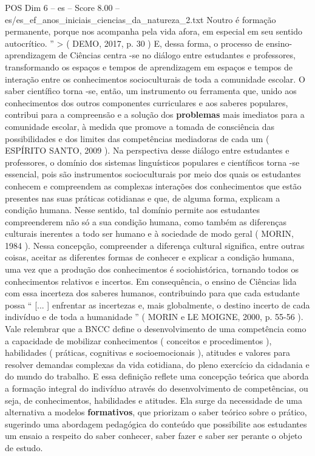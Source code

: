 \begin{textsample}{POS Dim 6 – es – Score 8.00 – es/es\_ef\_anos\_iniciais\_ciencias\_da\_natureza\_2.txt}
Noutro é formação permanente, porque nos acompanha pela vida afora, em especial em seu sentido autocrítico. ” > ( DEMO, 2017, p. 30 ) E, dessa forma, o processo de ensino-aprendizagem de Ciências centra -se no diálogo entre estudantes e professores, transformando os espaços e tempos de aprendizagem em espaços e tempos de interação entre os conhecimentos socioculturais de toda a comunidade escolar.
O saber científico torna -se, então, um instrumento ou ferramenta que, unido aos conhecimentos dos outros componentes curriculares e aos saberes populares, contribui para a compreensão e a solução dos \textbf{problemas} mais imediatos para a comunidade escolar, à medida que promove a tomada de consciência das possibilidades e dos limites das competências mediadoras de cada um ( ESPÍRITO SANTO, 2009 ).
Na perspectiva desse diálogo entre estudantes e professores, o domínio dos sistemas linguísticos populares e científicos torna -se essencial, pois são instrumentos socioculturais por meio dos quais os estudantes conhecem e compreendem as complexas interações dos conhecimentos que estão presentes nas suas práticas cotidianas e que, de alguma forma, explicam a condição humana.
Nesse sentido, tal domínio permite aos estudantes compreenderem não só a sua condição humana, como também as diferenças culturais inerentes a todo ser humano e à sociedade de modo geral ( MORIN, 1984 ).
Nessa concepção, compreender a diferença cultural significa, entre outras coisas, aceitar as diferentes formas de conhecer e explicar a condição humana, uma vez que a produção dos conhecimentos é sociohistórica, tornando todos os conhecimentos relativos e incertos.
Em consequência, o ensino de Ciências lida com essa incerteza dos saberes humanos, contribuindo para que cada estudante possa “ [... ] enfrentar as incertezas e, mais globalmente, o destino incerto de cada indivíduo e de toda a humanidade ” ( MORIN e LE MOIGNE, 2000, p. 55-56 ).
Vale relembrar que a BNCC define o desenvolvimento de uma competência como a capacidade de mobilizar conhecimentos ( conceitos e procedimentos ), habilidades ( práticas, cognitivas e socioemocionais ), atitudes e valores para resolver demandas complexas da vida cotidiana, do pleno exercício da cidadania e do mundo do trabalho.
E essa definição reflete uma concepção teórica que aborda a formação integral do indivíduo através do desenvolvimento de competências, ou seja, de conhecimentos, habilidades e atitudes.
Ela surge da necessidade de uma alternativa a modelos \textbf{formativos}, que priorizam o saber teórico sobre o prático, sugerindo uma abordagem pedagógica do conteúdo que possibilite aos estudantes um ensaio a respeito do saber conhecer, saber fazer e saber ser perante o objeto de estudo.

\end{textsample}
